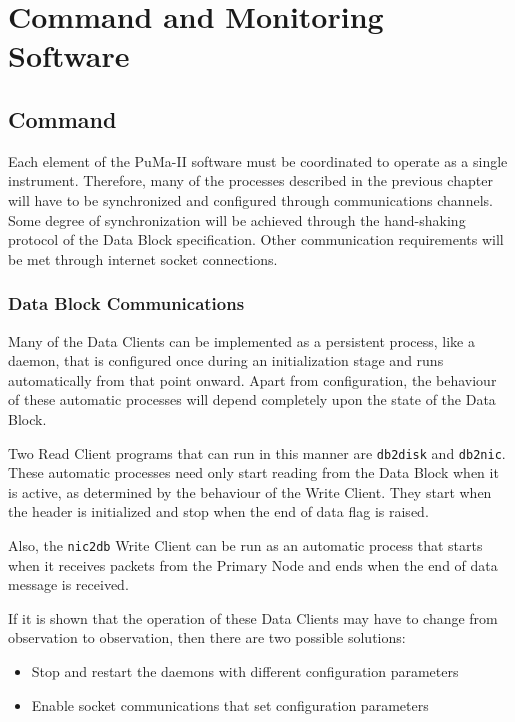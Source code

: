 \chapter{Command and Monitoring Software}

\section{Command}

Each element of the PuMa-II software must be coordinated to operate as
a single instrument.  Therefore, many of the processes described in
the previous chapter will have to be synchronized and configured
through communications channels.  Some degree of synchronization will
be achieved through the hand-shaking protocol of the Data Block
specification.  Other communication requirements will be met through
internet socket connections.

\subsection{Data Block Communications}

Many of the Data Clients can be implemented as a persistent process,
like a daemon, that is configured once during an initialization stage
and runs automatically from that point onward.  Apart from
configuration, the behaviour of these automatic processes will depend
completely upon the state of the Data Block.

Two Read Client programs that can run in this manner are {\tt db2disk}
and {\tt db2nic}.  These automatic processes need only start reading
from the Data Block when it is active, as determined by the behaviour
of the Write Client.  They start when the header is initialized and
stop when the end of data flag is raised.

Also, the {\tt nic2db} Write Client can be run as an automatic process
that starts when it receives packets from the Primary Node and ends
when the end of data message is received.

If it is shown that the operation of these Data Clients may have to
change from observation to observation, then there are two possible
solutions:
\begin{itemize}
\item Stop and restart the daemons with different configuration parameters
\item Enable socket communications that set configuration parameters
\end{itemize}

